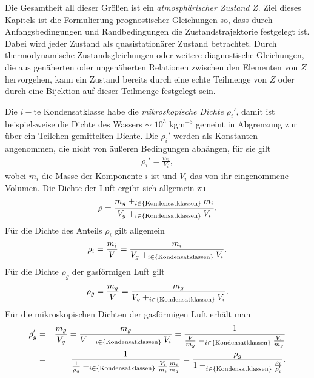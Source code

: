 \documentclass{book}
\let\sum\relax
\DeclareMathOperator*{\sum}{\raisebox{-3.5pt}{\scalebox{2}{\rotatebox{1}{{\bask Σ}}}}}
\begin{document}
%
Die Gesamtheit all dieser Größen ist ein \textit{atmosphärischer Zustand} $Z$. Ziel dieses Kapitels ist die Formulierung prognostischer Gleichungen so, dass durch Anfangsbedingungen und Randbedingungen die Zustandstrajektorie festgelegt ist. Dabei wird jeder Zustand als quasistationärer Zustand betrachtet. Durch thermodynamische Zustandsgleichungen oder weitere diagnostische Gleichungen, die aus genäherten oder ungenäherten Relationen zwischen den Elementen von $Z$ hervorgehen, kann ein Zustand bereits durch eine echte Teilmenge von $Z$ oder durch eine Bijektion auf dieser Teilmenge festgelegt sein.

Die $i-$te Kondensatklasse habe die \textit{mikroskopische Dichte} $\rho_i'$, damit ist beispielsweise die Dichte des Wassers $\sim$ $10^3$ kgm$^{-3}$ gemeint in Abgrenzung zur über ein Teilchen gemittelten Dichte. Die $\rho_i'$ werden als Konstanten angenommen, die nicht von äußeren Bedingungen abhängen, für sie gilt 
%
\begin{eqnarray}
\rho_i' = \frac{m_i}{V_i}, 
\end{eqnarray}
%
wobei $m_i$ die Masse der Komponente $i$ ist und $V_i$ das von ihr eingenommene Volumen. Die Dichte der Luft ergibt sich allgemein zu
%
\begin{eqnarray}
\rho = \frac{m_g + \sum_{i \in \left\lbrace\text{Kondensatklassen}\right\rbrace}m_i}{V_g + \sum_{i \in \left\lbrace\text{Kondensatklassen}\right\rbrace} V_i}.
\end{eqnarray}
%
Für die Dichte des Anteils $\rho_i$ gilt allgemein
%
\begin{eqnarray}
\rho_i = \frac{m_i}{V} = \frac{m_i}{V_g + \sum_{i \in \left\lbrace\text{Kondensatklassen}\right\rbrace}V_i}.
\end{eqnarray}
%
Für die Dichte $\rho_g$ der gasförmigen Luft gilt
%
\begin{eqnarray}
\rho_g = \frac{m_g}{V} = \frac{m_g}{V_g + \sum_{i \in \left\lbrace\text{Kondensatklassen}\right\rbrace}V_i}.
\end{eqnarray}
%
Für die mikroskopischen Dichten der gasförmigen Luft erhält man
%
\begin{eqnarray}
\rho_g' & = & \frac{m_g}{V_g} = \frac{m_g}{V - \sum_{i \in \left\lbrace\text{Kondensatklassen}\right\rbrace}V_i} = \frac{1}{\frac{V}{m_g} - \sum_{i \in \left\lbrace\text{Kondensatklassen}\right\rbrace}\frac{V_i}{m_g}}\nonumber\\
& = & \frac{1}{\frac{1}{\rho_g} - \sum_{i \in \left\lbrace\text{Kondensatklassen}\right\rbrace}\frac{V_i}{m_i}\frac{m_i}{m_g}} = \frac{\rho_g}{1 - \sum_{i \in \left\lbrace\text{Kondensatklassen}\right\rbrace}^{}\frac{\rho_i}{\rho_i'}}.
\end{eqnarray}
\end{document}

